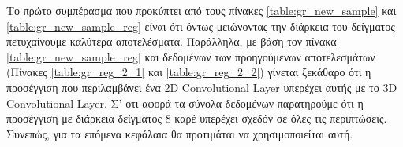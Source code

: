 Το πρώτο συμπέρασμα που προκύπτει από τους πίνακες \ref{table:gr_new_sample} και  \ref{table:gr_new_sample_reg}  είναι ότι όντως μειώνοντας την
διάρκεια του δείγματος πετυχαίνουμε καλύτερα αποτελέσματα. Παράλληλα, με βάση τον πίνακα \ref{table:gr_new_sample_reg} και δεδομένων των
προηγούμενων αποτελεσμάτων (Πίνακες \ref{table:gr_reg_2_1} και \ref{table:gr_reg_2_2}) γίνεται ξεκάθαρο ότι η προσέγγιση που περιλαμβάνει
ένα \en 2D Convolutional Layer \gr υπερέχει αυτής με το \en 3D Convolutional Layer\gr. Σ' οτι αφορά τα σύνολα δεδομένων παρατηρούμε ότι
η προσέγγιση με διάρκεια δείγματος 8 καρέ υπερέχει σχεδόν σε όλες τις περιπτώσεις. Συνεπώς, για τα επόμενα κεφάλαια θα προτιμάται
να χρησιμοποιείται αυτή.

% 